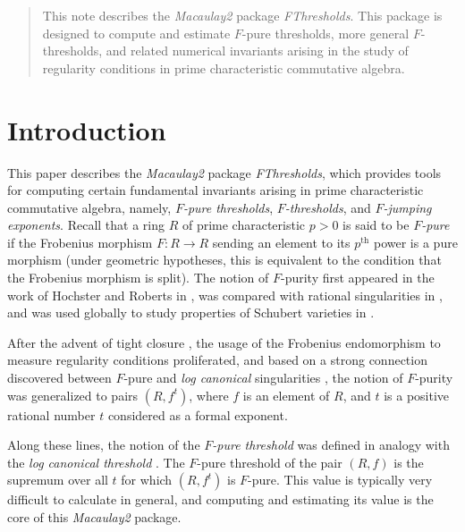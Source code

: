 \documentclass{amsart}
\begin{document}
\begin{abstract}
	This note describes the \emph{Macaulay2} package \emph{FThresholds}.  This package is designed to compute and estimate $F$-pure thresholds, more general $F$-thresholds, and related numerical invariants arising in the study of regularity conditions in prime characteristic commutative algebra.
\end{abstract}




\maketitle

\section{Introduction}

This paper describes the \emph{Macaulay2} package \emph{FThresholds}, which provides tools for computing certain fundamental invariants arising in prime characteristic commutative algebra, namely, \emph{$F$-pure thresholds}, \emph{$F$-thresholds}, and \emph{$F$-jumping exponents}.  Recall that a ring $R$ of prime characteristic $p>0$ is said to be \emph{$F$-pure} if the Frobenius morphism $F : R \to R$ sending an element to its $p^\text{th}$ power is a pure morphism (under geometric hypotheses, this is equivalent to the condition that the Frobenius morphism is split).  The notion of $F$-purity first appeared in the work of Hochster and Roberts in \cite{HochsterRobertsFrobeniusLocalCohomology}, was compared with rational singularities in \cite{FedderFPureRat}, and was used globally to study properties of Schubert varieties in \cite{MehtaRamanathanFrobeniusSplittingAndCohomologyVanishing}.

After the advent of tight closure \cite{HochsterHunekeTC1}, the usage of the Frobenius endomorphism to measure regularity conditions proliferated, and based on a strong connection discovered between $F$-pure and \emph{log canonical} singularities \cite{HaraWatanabeFRegFPure}, the notion of $F$-purity was generalized to pairs $(R, f^t)$, where $f$ is an element of $R$, and $t$ is a positive rational number $t$ considered as a formal exponent.  

Along these lines, the notion of the \emph{$F$-pure threshold} was defined in analogy with the \emph{log canonical threshold} \cite{TakagiWatanabeFPureThresh,MustataTakagiWatanabeFThresholdsAndBernsteinSato}.  
The $F$-pure threshold of the pair $(R, f)$ is the supremum over all $t$ for which $(R, f^t)$ is $F$-pure.  
This value is typically very difficult to calculate in general, and computing and estimating its value is the core of this \emph{Macaulay2} package. 
\end{document}
